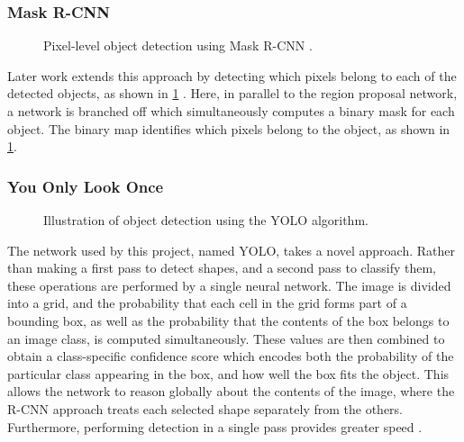 \documentclass[\rootfolder/main.tex]{subfiles}
\begin{document}
\subsubsection{Mask R-CNN}

\begin{figure}[H]
    \caption{Pixel-level object detection using Mask R-CNN \cite{He2017}.\label{fig:mask-rcnn}}
\end{figure}

Later work extends this approach by detecting which pixels belong to each of the detected objects, as shown in \cref{fig:mask-rcnn} \cite{He2017}.
Here, in parallel to the region proposal network, a network is branched off which simultaneously computes a binary mask for each object.
The binary map identifies which pixels belong to the object, as shown in \cref{fig:mask-rcnn}.

\subsubsection{You Only Look Once}

\begin{figure}[H]
    \caption{Illustration of object detection using the YOLO algorithm\cite{JosephRedmon}.\label{fig:yolo}}
\end{figure}

The network used by this project, named YOLO, takes a novel approach.
Rather than making a first pass to detect shapes, and a second pass to classify them, these operations are performed by a single neural network.
The image is divided into a grid, and the probability that each cell in the grid forms part of a bounding box, as well as the probability that the contents of the box belongs to an image class, is computed simultaneously.
These values are then combined to obtain a class-specific confidence score which encodes both the probability of the particular class appearing in the box, and how well the box fits the object.
This allows the network to reason globally about the contents of the image, where the R-CNN approach treats each selected shape separately from the others.
Furthermore, performing detection in a single pass provides greater speed \cite{Redmon2015}.

\end{document}
